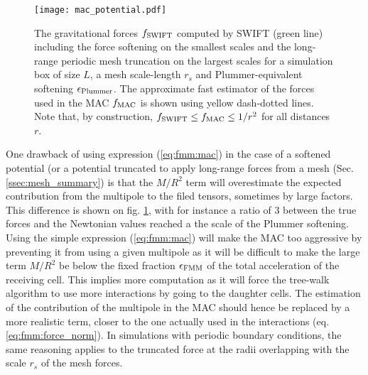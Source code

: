 \begin{figure}
\texttt{[image: mac\_potential.pdf]}
\caption{The gravitational forces $f_{\rm SWIFT}$ computed by SWIFT
  (green line) including the force softening on the smallest scales
  and the long-range periodic mesh truncation on the largest scales
  for a simulation box of size $L$, a mesh scale-length $r_s$ and
  Plummer-equivalent softening $\epsilon_{\rm Plummer}$. The
  approximate fast estimator of the forces used in the MAC $f_{\rm
    MAC}$ is shown using yellow dash-dotted lines. Note that, by
  construction, $f_{\rm SWIFT} \leq f_{\rm MAC} \leq 1/r^2$ for all
  distances $r$.}
\label{fig:fmm:mac_potential}
\end{figure}

One drawback of using expression (\ref{eq:fmm:mac}) in the case of a
softened potential (or a potential truncated to apply long-range
forces from a mesh (Sec. \ref{ssec:mesh_summary}) is that the $M/R^2$
term will overestimate the expected contribution from the multipole to
the filed tensors, sometimes by large factors. This difference is
shown on fig. \ref{fig:fmm:mac_potential}, with for instance a ratio
of $3$ between the true forces and the Newtonian values reached a the
scale of the Plummer softening. Using the simple expression
(\ref{eq:fmm:mac}) will make the MAC too aggressive by preventing it
from using a given multipole as it will be difficult to make the large
term $M/R^2$ be below the fixed fraction $\epsilon_{\rm FMM}$ of the
total acceleration of the receiving cell. This implies more
computation as it will force the tree-walk algorithm to use more
interactions by going to the daughter cells. The estimation of the
contribution of the multipole in the MAC should hence be replaced by a
more realistic term, closer to the one actually used in the
interactions (eq. \ref{eq:fmm:force_norm}). In simulations with
periodic boundary conditions, the same reasoning applies to the
truncated force at the radii overlapping with the scale $r_s$ of the
mesh forces.

